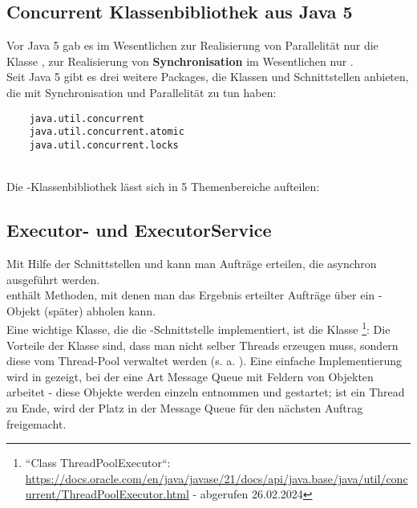 \subsection{Concurrent Klassenbibliothek aus Java 5}

Vor Java 5 gab es im Wesentlichen zur Realisierung von Parallelität nur die Klasse , zur Realisierung von \textbf{Synchronisation} im Wesentlichen nur .\\

\noindent
Seit Java 5 gibt es drei weitere Packages, die Klassen und Schnittstellen anbieten, die mit Synchronisation und Parallelität zu tun haben:



\begin{verbatim}
    java.util.concurrent
    java.util.concurrent.atomic
    java.util.concurrent.locks
\end{verbatim}\\

\noindent
Die -Klassenbibliothek lässt sich in 5 Themenbereiche aufteilen:

\subsection*{Executor- und ExecutorService}
Mit Hilfe der Schnittstellen  und  kann man Aufträge erteilen, die asynchron ausgeführt werden.\\

\noindent
{} enthält Methoden, mit denen man das Ergebnis erteilter Aufträge über ein -Objekt (später) abholen kann.\\

\noindent
Eine wichtige Klasse, die die -Schnittstelle implementiert, ist die Klasse \footnote{
``Class ThreadPoolExecutor``: \url{https://docs.oracle.com/en/java/javase/21/docs/api/java.base/java/util/concurrent/ThreadPoolExecutor.html} - abgerufen 26.02.2024
}:
Die Vorteile der Klasse sind, dass man nicht selber Threads erzeugen muss, sondern diese vom Thread-Pool verwaltet werden (s. a. \cite[146]{Oec22}).
Eine einfache Implementierung wird in \cite[144]{Oec22} gezeigt, bei der eine Art Message Queue mit Feldern von 
Objekten arbeitet - diese Objekte werden einzeln entnommen und gestartet; ist ein Thread zu Ende, wird der Platz in der
Message Queue für den nächsten Auftrag freigemacht.
\\

